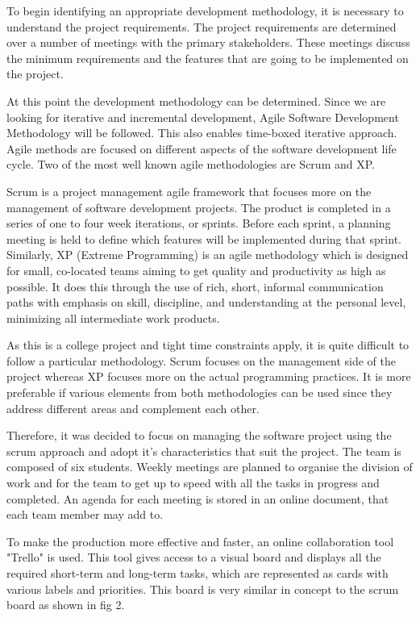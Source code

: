To begin identifying an appropriate development methodology, it is necessary to understand the project requirements. The project requirements are determined over a number of meetings with the primary stakeholders. These meetings discuss the minimum requirements and the features that are going to be implemented on the project. 

At this point the development methodology can be determined. Since we are looking for iterative and incremental development, Agile Software Development Methodology will be followed. This also enables time-boxed iterative approach. Agile methods are focused on different aspects of the software development life cycle. Two of the most well known agile methodologies are Scrum and XP.

Scrum is a project management agile framework that focuses more on the management of software development projects. The product is completed in a series of one to four week iterations, or sprints. Before each sprint, a planning meeting is held to define which features will be implemented during that sprint. Similarly, XP (Extreme Programming) is an agile methodology which is designed for small, co-located teams aiming to get quality and productivity as high as possible. It does this through the use of rich, short, informal communication paths with emphasis on skill, discipline, and understanding at the personal level, minimizing all intermediate work products.

As this is a college project and tight time constraints apply, it is quite
difficult to follow a particular methodology. Scrum focuses on the management
side of the project whereas XP focuses more on the actual programming
practices. It is more preferable if various elements from both methodologies
can be used since they address different areas and complement each other.

Therefore, it was decided to focus on managing the software project using the scrum
approach and adopt it's characteristics that suit the project. The team is
composed of six students. Weekly meetings are planned to organise the division
of work and for the team to get up to speed with all the tasks in progress and
completed. An agenda for each meeting is stored in an online document, that
each team member may add to. 

To make the production more effective and faster, an online collaboration tool
"Trello" is used. This tool gives access to a visual board and displays all the
required short-term and long-term tasks, which are represented as cards with
various labels and priorities. This board is very similar in concept to the
scrum board as shown in fig 2.

